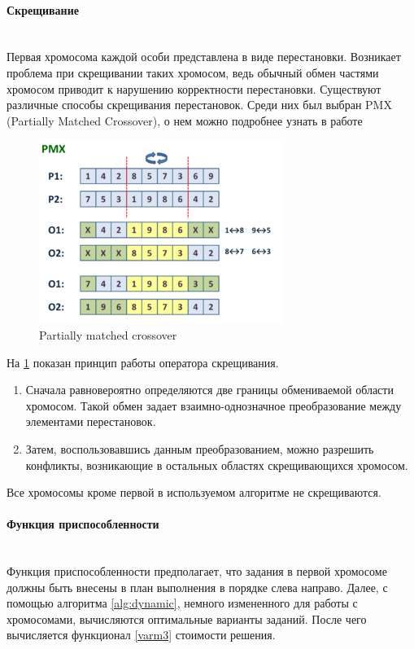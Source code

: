 \documentclass[a4paper,14pt,russian]{article}
\begin{document}
\paragraph{Скрещивание} ~\\
Первая хромосома каждой особи представлена в виде перестановки. Возникает проблема при скрещивании таких хромосом, ведь обычный обмен частями хромосом приводит к нарушению корректности перестановки. Существуют различные способы скрещивания перестановок. Среди них был выбран PMX (Partially Matched Crossover), о нем можно подробнее узнать в работе \cite{goldberg1985alleles}

\begin{figure}[here]
\includegraphics{images/300px-Pmx.png}
\caption{Partially matched crossover}
\label{fig:pmx}
\end{figure}

На \cref{fig:pmx} показан принцип работы оператора скрещивания.
\begin{enumerate}
\item Сначала равновероятно определяются две границы обмениваемой области хромосом. Такой обмен задает взаимно-однозначное преобразование между элементами перестановок.
\item Затем, воспользовавшись данным преобразованием, можно разрешить конфликты, возникающие в остальных областях скрещивающихся хромосом.
\end{enumerate}
Все хромосомы кроме первой в используемом алгоритме не скрещиваются.

\paragraph{Функция приспособленности} ~\\
Функция приспособленности предполагает, что задания в первой хромосоме должны быть внесены в план выполнения в порядке слева направо.
Далее, с помощью алгоритма \eqref{alg:dynamic}, немного измененного для работы с хромосомами, вычисляются оптимальные варианты заданий.
После чего вычисляется функционал \eqref{varm3} стоимости решения.
\end{document}
